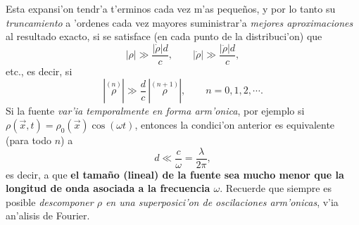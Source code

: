 Esta expansi'on tendr'a t'erminos cada vez m'as pequeños, y por lo tanto su \textit{truncamiento} a 'ordenes cada vez mayores suministrar'a \textit{mejores aproximaciones} al resultado exacto, si se satisface (en cada punto de la distribuci'on) que
\begin{equation}
 |\rho|\gg \frac{|\dot{\rho}|d}{c}, \qquad  |\dot{\rho}|\gg \frac{|\ddot{\rho}|d}{c},
\end{equation}
etc., es decir, si
\begin{equation}
|\stackrel{(n)}{\rho}|\gg \frac{d}{c}\,|\stackrel{(n+1)}{\rho}|, \qquad n=0,1,2,\cdots .
\end{equation}
Si la fuente \textit{var'ia temporalmente en forma arm'onica}, por ejemplo si $\rho(\vec{x},t)=\rho_0(\vec{x})\cos(\omega t)$, entonces la condici'on anterior es equivalente (para todo $n$) a
\begin{equation}
d\ll\frac{c}{\omega}=\frac{\lambda}{2\pi},
\end{equation}
es decir, a que \textbf{el tamaño (lineal) de la fuente sea mucho menor que la longitud de onda asociada a la frecuencia $\omega$}. Recuerde que siempre es posible \textit{descomponer $\rho$ en una superposici'on de oscilaciones arm'onicas}, v'ia an'alisis de Fourier.

